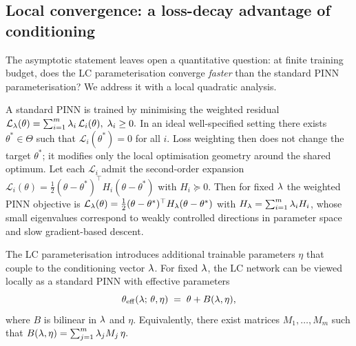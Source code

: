 \documentclass[12pt,a4paper]{extarticle}
\begin{document}
\subsection{Local convergence: a loss-decay advantage of conditioning}

The asymptotic statement leaves open a quantitative question: at finite training budget, does the LC parameterisation converge \emph{faster} than the standard PINN parameterisation? We address it with a local quadratic analysis.

A standard PINN is trained by minimising the weighted residual
\(
    \mathcal{L}_\lambda(\theta) = \sum_{i=1}^m \lambda_i\, \mathcal{L}_i(\theta), \; \lambda_i \ge 0.
\)
In an ideal well-specified setting there exists $\theta^* \in \Theta$ such that $\mathcal{L}_i(\theta^*) = 0$ for all $i$. Loss weighting then does not change the target $\theta^*$; it modifies only the local optimisation geometry around the shared optimum. Let each $\mathcal{L}_i$ admit the second-order expansion $\mathcal{L}_i(\theta) = \tfrac{1}{2} (\theta - \theta^*)^\top H_i (\theta - \theta^*)$ with $H_i \succeq 0$. Then for fixed $\lambda$ the weighted PINN objective is $\mathcal{L}_\lambda(\theta) = \tfrac{1}{2} (\theta - \theta^*)^\top H_\lambda (\theta - \theta^*)$ with $H_\lambda = \sum_{i = 1}^{m} \lambda_i H_i$, whose small eigenvalues correspond to weakly controlled directions in parameter space and slow gradient-based descent.

The LC parameterisation introduces additional trainable parameters $\eta$ that couple to the conditioning vector $\lambda$. For fixed $\lambda$, the LC network can be viewed locally as a standard PINN with effective parameters
\begin{equation*}
    \theta_{\mathrm{eff}}(\lambda;\, \theta, \eta) \;=\; \theta + B(\lambda, \eta),
\end{equation*}
where $B$ is bilinear in $\lambda$ and $\eta$. Equivalently, there exist matrices $M_1, \ldots, M_m$ such that
\(
    B(\lambda, \eta) = \sum_{j=1}^m \lambda_j M_j\, \eta.
\)
\end{document}
